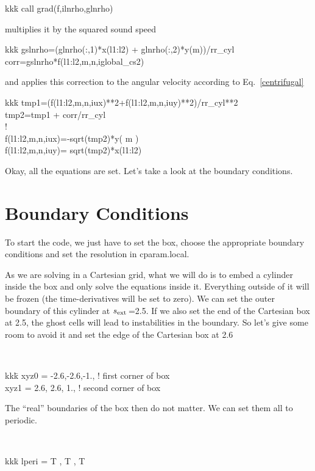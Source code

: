 \documentclass[a4paper,10pt]{article}
\newcommand{\rext}{$s_{\rm ext}\,$}
\begin{document}
{\tt \begin{tabbing}
kkk\=\kill
call grad(f,ilnrho,glnrho) 
\end{tabbing}}multiplies it by the squared sound speed

{\tt \begin{tabbing}
kkk\=\kill
\>            gslnrho=(glnrho(:,1)*x(l1:l2) + glnrho(:,2)*y(m))/rr\_cyl\\
\>            corr=gslnrho*f(l1:l2,m,n,iglobal\_cs2)
\end{tabbing}}and applies this correction to the angular velocity according to Eq.~\ref{centrifugal} 

{\tt \begin{tabbing}
kkk\=\kill
\>            tmp1=(f(l1:l2,m,n,iux)**2+f(l1:l2,m,n,iuy)**2)/rr\_cyl**2\\
\>	    tmp2=tmp1 + corr/rr\_cyl\\
!\\
\>	    f(l1:l2,m,n,iux)=-sqrt(tmp2)*y(  m  )\\
\>            f(l1:l2,m,n,iuy)= sqrt(tmp2)*x(l1:l2)
\end{tabbing}}

Okay, all the equations are set. Let's take a look at the boundary conditions.

\section{Boundary Conditions}

To start the code, we just have to set the box, choose the appropriate boundary conditions and set the resolution in cparam.local. 

As we are solving in a Cartesian grid, what we will do is to embed a cylinder inside the box and only solve the equations inside it. Everything outside of it will be frozen (the time-derivatives will be set to zero). We can set the outer boundary of this cylinder at \rext=2.5. If we also set the end of the Cartesian box at 2.5, the ghost cells will lead to instabilities in the boundary. So let's give some room to avoid it and set the edge of the Cartesian box at 2.6

{\tt 
\begin{tabbing}
  kkk\=\kill
  \>xyz0  = -2.6,-2.6,-1.,     ! first corner of box\\
  \>xyz1  =  2.6, 2.6, 1.,     ! second corner of box
\end{tabbing}
}

The ``real'' boundaries of the box then do not matter. We can set them all to periodic. 
{\tt 
\begin{tabbing}
  kkk\=\kill
  \>lperi = T  , T  , T
\end{tabbing}
}
\end{document}
